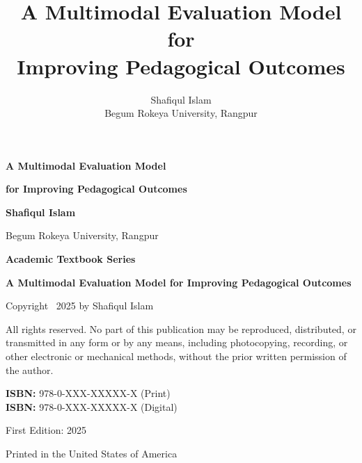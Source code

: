 \documentclass[11pt,twoside,openright]{book}
\title{\textcolor{pearsonblue}{\textbf{\textsf{A Multimodal Evaluation Model for \\ Improving Pedagogical Outcomes}}}}
\author{
    \large\textsf{Shafiqul Islam} \\
    \normalsize\textsf{Begum Rokeya University, Rangpur}
}
\date{}
\begin{document}
\frontmatter
\thispagestyle{empty}

\begin{center}
\vspace*{2cm}

{\Huge\sffamily\bfseries\color{pearsonblue}A Multimodal Evaluation Model}

\vspace{0.5cm}

{\Huge\sffamily\bfseries\color{pearsonblue}for Improving Pedagogical Outcomes}

\vspace{3cm}

{\Large\sffamily\bfseries Shafiqul Islam}

\vspace{0.5cm}

{\normalsize\sffamily Begum Rokeya University, Rangpur}

\vfill

{\large\sffamily\color{pearsongray}\textbf{Academic Textbook Series}}

\vspace{1cm}

\end{center}

\newpage

\thispagestyle{empty}
\vspace*{\fill}
\begin{flushleft}
\small\sffamily
\textbf{A Multimodal Evaluation Model for Improving Pedagogical Outcomes}

Copyright \textcopyright\ 2025 by Shafiqul Islam

All rights reserved. No part of this publication may be reproduced, distributed, or transmitted in any form or by any means, including photocopying, recording, or other electronic or mechanical methods, without the prior written permission of the author.

\vspace{0.5cm}

\textbf{ISBN:} 978-0-XXX-XXXXX-X (Print) \\
\textbf{ISBN:} 978-0-XXX-XXXXX-X (Digital)

\vspace{0.5cm}

First Edition: 2025

\vspace{0.5cm}

Printed in the United States of America
\end{flushleft}
\end{document}
